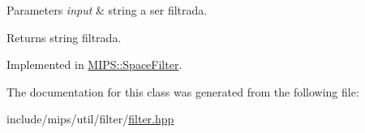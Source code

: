 \begin{DoxyParams}{Parameters}
{\em input} & string a ser filtrada. \\
\hline
\end{DoxyParams}
\begin{DoxyReturn}{Returns}
string filtrada. 
\end{DoxyReturn}


Implemented in \hyperlink{classMIPS_1_1SpaceFilter_af6182f9ed8fb061e3ab9d7b437234952}{M\+I\+P\+S\+::\+Space\+Filter}.



The documentation for this class was generated from the following file\+:\begin{DoxyCompactItemize}
\item 
include/mips/util/filter/\hyperlink{filter_8hpp}{filter.\+hpp}\end{DoxyCompactItemize}
